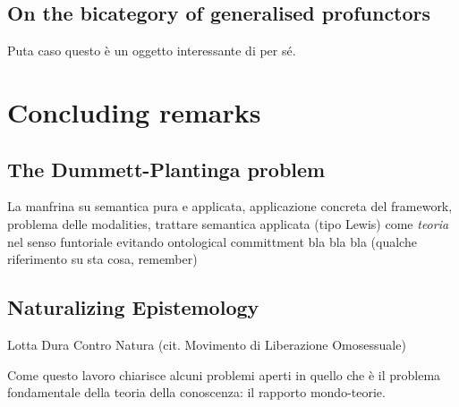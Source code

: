 \documentclass[a4paper]{../birkjour}
\begin{document}
\subsection{On the bicategory of generalised profunctors}
Puta caso questo è un oggetto interessante di per sé.

\section{Concluding remarks}

\subsection{The Dummett-Plantinga problem}
La manfrina su semantica pura e applicata, applicazione concreta del framework, problema delle modalities, trattare semantica applicata (tipo Lewis) come \emph{teoria} nel senso funtoriale evitando ontological committment bla bla bla (qualche riferimento su sta cosa, remember)

\subsection{Naturalizing Epistemology}
Lotta Dura Contro Natura (cit. Movimento di Liberazione Omosessuale)

Come questo lavoro chiarisce alcuni problemi aperti in quello che è il problema fondamentale della teoria della conoscenza: il rapporto mondo-teorie. 
 
{}

\end{document}
